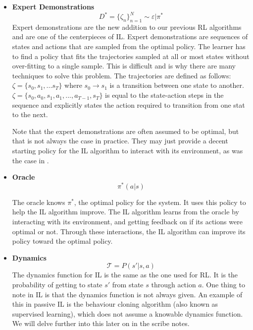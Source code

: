 \documentclass[11pt]{article}
\begin{document}
\begin{itemize}
    \item \textbf{Expert Demonstrations}
    \begin{equation}
        D^* = \{\zeta_n\}_{n=1}^N\sim \varepsilon|\pi^*
    \end{equation}
    Expert demonstrations are the new addition to our previous RL algorithms and are one of the centerpieces of IL. Expert demonstrations are sequences of states and actions that are sampled from the optimal policy. The learner has to find a policy that fits the trajectories sampled at all or most states without over-fitting to a single sample. This is difficult and is why there are many techniques to solve this problem. The trajectories are defined as follows: $\zeta=\{s_0, s_1,...s_T\}$ where $s_0 \rightarrow s_1$ is a transition between one state to another. $\zeta=\{s_0, a_0, s_1, a_1,...,a_{T-1},s_T\}$ is equal to the state-action steps in the sequence and explicitly states the action required to transition from one stat to the next. 
    
    Note that the expert demonstrations are often assumed to be optimal, but that is not always the case in practice. They may just provide a decent starting policy for the IL algorithm to interact with its environment, as was the case in \cite{baseballRL}.
    
    \item \textbf{Oracle}
    \begin{equation}
        \pi^*(a|s)
    \end{equation}
    
    The oracle knows $\pi^*$, the optimal policy for the system. It uses this policy to help the IL algorithm improve. The IL algorithm learns from the oracle by interacting with its environment, and getting feedback on if its actions were optimal or not. Through these interactions, the IL algorithm can improve its policy toward the optimal policy.
    
    \item \textbf{Dynamics}
    \begin{equation}
        \mathcal{T} = P(s'|s,a)
    \end{equation}
    The dynamics function for IL is the same as the one used for RL. It is the probability of getting to state $s'$ from state $s$ through action $a$. One thing to note in IL is that the dynamics function is not always given. An example of this in passive IL is the behaviour cloning  algorithm (also known as supervised learning), which does not assume a knowable dynamics function. We will delve further into this later on in the scribe notes.
    

\end{itemize}
\end{document}
